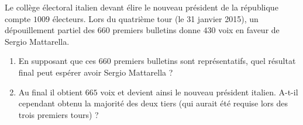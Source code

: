 
\begin{exercice}\label{exo2smath-0127}

    Le collège électoral italien devant élire le nouveau président de la république compte \( 1009\) électeurs. Lors du quatrième tour (le 31 janvier 2015), un dépouillement partiel des \( 660\) premiers bulletins donne \( 430\) voix en faveur de Sergio Mattarella.
    \begin{enumerate}
        \item
            En supposant que ces \( 660\) premiers bulletins sont représentatifs, quel résultat final peut espérer avoir Sergio Mattarella ?
        \item
            Au final il obtient \( 665\) voix et devient ainsi le nouveau président italien. A-t-il cependant obtenu la majorité des deux tiers (qui aurait été requise lors des trois premiers tours) ?
    \end{enumerate}

\end{exercice}
